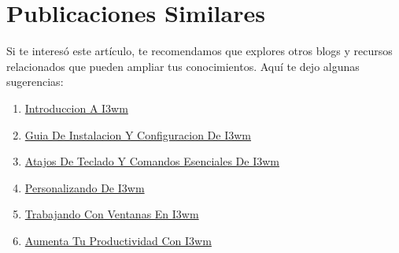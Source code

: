 \documentclass[
  jou,
  floatsintext,
  longtable,
  a4paper,
  nolmodern,
  notxfonts,
  notimes,
  colorlinks=true,linkcolor=blue,citecolor=blue,urlcolor=blue]{apa7}
\providecommand{\tightlist}{%
  \setlength{\itemsep}{0pt}\setlength{\parskip}{0pt}}
\begin{document}
\section{Publicaciones Similares}\label{publicaciones-similares}

Si te interesó este artículo, te recomendamos que explores otros blogs y
recursos relacionados que pueden ampliar tus conocimientos. Aquí te dejo
algunas sugerencias:

\begin{enumerate}
\def\labelenumi{\arabic{enumi}.}
\tightlist
\item
  \href{https://achalmaedison.netlify.app/tecnologia-seguridad/i3wm/2020-02-15-introduccion-a-i3wm/index.pdf}{}
  \href{https://achalmaedison.netlify.app/tecnologia-seguridad/i3wm/2020-02-15-introduccion-a-i3wm}{Introduccion
  A I3wm}
\item
  \href{https://achalmaedison.netlify.app/tecnologia-seguridad/i3wm/2020-02-16-guia-de-instalacion-y-configuracion-de-i3wm/index.pdf}{}
  \href{https://achalmaedison.netlify.app/tecnologia-seguridad/i3wm/2020-02-16-guia-de-instalacion-y-configuracion-de-i3wm}{Guia
  De Instalacion Y Configuracion De I3wm}
\item
  \href{https://achalmaedison.netlify.app/tecnologia-seguridad/i3wm/2020-02-17-atajos-de-teclado-y-comandos-esenciales-de-i3wm/index.pdf}{}
  \href{https://achalmaedison.netlify.app/tecnologia-seguridad/i3wm/2020-02-17-atajos-de-teclado-y-comandos-esenciales-de-i3wm}{Atajos
  De Teclado Y Comandos Esenciales De I3wm}
\item
  \href{https://achalmaedison.netlify.app/tecnologia-seguridad/i3wm/2020-02-18-personalizando-de-i3wm/index.pdf}{}
  \href{https://achalmaedison.netlify.app/tecnologia-seguridad/i3wm/2020-02-18-personalizando-de-i3wm}{Personalizando
  De I3wm}
\item
  \href{https://achalmaedison.netlify.app/tecnologia-seguridad/i3wm/2020-02-18-trabajando-con-ventanas-en-i3wm/index.pdf}{}
  \href{https://achalmaedison.netlify.app/tecnologia-seguridad/i3wm/2020-02-18-trabajando-con-ventanas-en-i3wm}{Trabajando
  Con Ventanas En I3wm}
\item
  \href{https://achalmaedison.netlify.app/tecnologia-seguridad/i3wm/2020-02-19-aumenta-tu-productividad-con-i3wm/index.pdf}{}
  \href{https://achalmaedison.netlify.app/tecnologia-seguridad/i3wm/2020-02-19-aumenta-tu-productividad-con-i3wm}{Aumenta
  Tu Productividad Con I3wm}

\end{enumerate}
\end{document}
